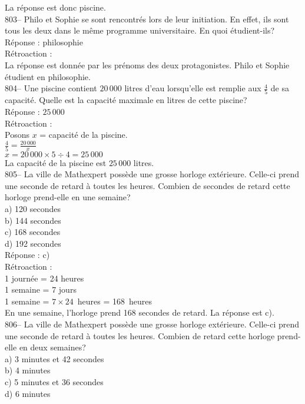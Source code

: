 ﻿\documentclass[letterpaper, 12pt]{article}
\begin{document}
La r\'eponse est donc piscine.\\

803-- Philo et Sophie se sont rencontr\'es lors de leur initiation. En
effet, ils sont tous les deux dans le m\^eme programme universitaire.  En
quoi \'etudient-ils?\\

R\'eponse : philosophie\\

R\'etroaction : \\
La r\'eponse est donn\'ee par les pr\'enoms des deux protagonistes.  Philo
et Sophie \'etudient en philosophie.\\

804-- Une piscine contient $20\,000$ litres d'eau lorsqu'elle est remplie
aux $\frac{4}{5}$ de sa capacit\'e. Quelle est la capacit\'e maximale en
litres de cette piscine?\\

R\'eponse : $25\,000$\\

R\'etroaction : \\
Posons $x$ = capacit\'e de la piscine.\\
$\frac{4}{5}=\frac{20\,000}{x}$\\
$x=20\,000\times5\div4=25\,000$\\
La capacit\'e de la piscine est $25\,000$ litres.\\

805-- La ville de Mathexpert poss\`ede une grosse horloge ext\'erieure.
Celle-ci prend une seconde de retard \`a toutes les heures.  Combien de
secondes de retard cette horloge prend-elle en une semaine?\\
a) 120 secondes\\
b) 144 secondes\\
c) 168 secondes\\
d) 192 secondes\\

R\'eponse : c)\\

R\'etroaction : \\
1 journ\'ee = 24 heures\\
1 semaine = 7 jours\\
1 semaine = $7\times24$~heures = 168~heures\\
En une semaine, l'horloge prend 168 secondes de retard.  La r\'eponse est
c).\\

806-- La ville de Mathexpert poss\`ede une grosse horloge ext\'erieure.
Celle-ci prend une seconde de retard \`a toutes les heures.  Combien de
retard cette horloge prend-elle en deux semaines?\\
a) 3 minutes et 42 secondes\\
b) 4 minutes\\
c) 5 minutes et 36 secondes\\
d) 6 minutes\\
\end{document}
